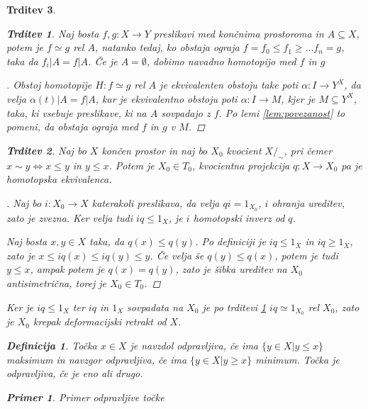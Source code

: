 \documentclass[a4paper,12pt]{article}
\theoremstyle{definition}
\newtheorem{definicija}{Definicija}
\theoremstyle{plain}
\theoremstyle{definition}
\newtheorem{primer}{Primer}
\theoremstyle{plain}
\newtheorem{trditev}{Trditev}
\theoremstyle{plain}
\theoremstyle{plain}
\theoremstyle{plain}
\newenvironment{dokaz}{\begin{proof}[\bfseries\upshape\proofname]}{\end{proof}}
\begin{document}
\begin{trditev}
\begin{trditev}
    \label{iz:ograje}
Naj bosta $f,g: X\rightarrow Y$ preslikavi med končnima prostoroma in $A\subseteq X$, potem je $f\simeq g$ rel $A$, natanko tedaj, ko obstaja ograja $f=f_0\leq f_1\geq ... f_n=g$, taka da $f_i|A=f|A$. Če je $A=\emptyset$, dobimo navadno homotopijo med $f$ in $g$
\end{trditev}

\begin{dokaz}
    Obstoj homotopije $H:f\simeq g$ rel $A$ je ekvivalenten obstoju take poti $\alpha: I \rightarrow Y^X$, da velja $\alpha(t)|A=f|A$, kar je ekvivalentno obstoju poti 
    $\alpha: I \rightarrow M$, kjer je $M\subseteq Y^X$, taka, ki vsebuje preslikave, ki na $A$ sovpadajo z $f$. Po lemi \ref{lem:povezanost} to pomeni, da obstaja ograja 
    med $f$ in $g$ v $M$.
\end{dokaz}

\begin{trditev}
    Naj bo $X$ končen prostor in naj bo $X_0$ kvocient $X/_\sim$, pri čemer $x\sim y \Leftrightarrow x\le y$ in $y\le x$. Potem je $X_0\in T_0$, kvocientna projekcija $q:X\rightarrow X_0$ pa je homotopska ekvivalenca.
\end{trditev}

\begin{dokaz}
    Naj bo $i:X_0\rightarrow X$ katerakoli preslikava, da velja $qi=1_{X_0}$, $i$ ohranja ureditev, zato je zvezna. Ker velja tudi $iq \leq 1_X$, je $i$ homotopski inverz od $q$.

    Naj bosta $x,y\in X$ taka, da $q(x)\leq q(y)$. Po definiciji je $iq \leq 1_X$ in $iq \geq 1_X$, zato je $x \leq iq(x) \leq iq(y) \leq y$. Če velja še $q(y)\leq q(x)$, potem je tudi $y\leq x$, ampak potem je $q(x)=q(y)$, zato je šibka ureditev na $X_0$ antisimetrična, torej je $X_0\in T_0$.
\end{dokaz}


    Ker je $iq\leq 1_X$ ter $iq$ in $1_X$ sovpadata na $X_0$ je po trditevi \ref{iz:ograje} 
    $iq \simeq 1_{X_0}$ rel $X_0$, zato je $X_0$ krepak deformacijski retrakt od $X$.


\begin{definicija}
    Točka $x \in X$ je \textit{navzdol odpravljiva}, če ima $\{y\in X | y \le x\}$ maksimum in \textit{navzgor odpravljiva}, če ima $\{y\in X | y \ge x\}$ minimum. 
    Točka je odpravljiva, če je eno ali drugo.
\end{definicija}

\begin{primer}
    Primer odpravljive točke
\end{primer}


\end{trditev}
\end{document}

